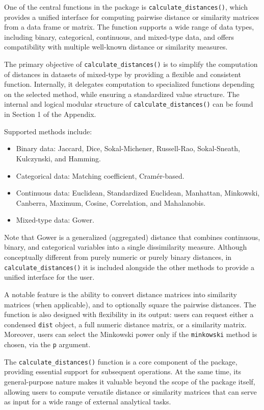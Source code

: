 One of the central functions in the  package is \texttt{calculate\_distances()}, which provides a unified interface for computing pairwise distance or similarity matrices from a data frame or matrix. The function supports a wide range of data types, including binary, categorical, continuous, and mixed-type data, and offers compatibility with multiple well-known distance or similarity measures.

The primary objective of \texttt{calculate\_distances()} is to simplify the computation of distances in datasets of mixed-type by providing a flexible and consistent function. Internally, it delegates computation to specialized functions depending on the selected method, while ensuring a standardized value structure. The internal and logical modular structure of \texttt{calculate\_distances()} can be found in Section 1
of the Appendix.

Supported methods include:
\begin{itemize}
  \item Binary data: Jaccard, Dice, Sokal-Michener, Russell-Rao, Sokal-Sneath, Kulczynski, and Hamming.
  \item Categorical data: Matching coefficient, Cramér-based.
  \item Continuous data: Euclidean, Standardized Euclidean, Manhattan, Minkowski, Canberra, Maximum, Cosine, Correlation, and Mahalanobis.
  \item Mixed-type data: Gower. 
\end{itemize}

Note that Gower is a generalized (aggregated) distance that combines continuous, binary, and categorical variables into a single dissimilarity measure. Although conceptually different from purely numeric or purely binary distances, in \texttt{calculate\_distances()} it is included alongside the other methods to provide a unified interface for the user.

A notable feature is the ability to convert distance matrices into similarity matrices (when applicable), and to optionally square the pairwise distances. The function is also designed with flexibility in its output: users can request either a condensed \texttt{dist} object, a full numeric distance matrix, or a similarity matrix. Moreover, users can select the Minkowski power only if the \texttt{minkowski} method is chosen, via the \texttt{p} argument.

The \texttt{calculate\_distances()} function is a core component of the  package, providing essential support for subsequent operations. At the same time, its general-purpose nature makes it valuable beyond the scope of the package itself, allowing users to compute versatile distance or similarity matrices that can serve as input for a wide range of external analytical tasks.

